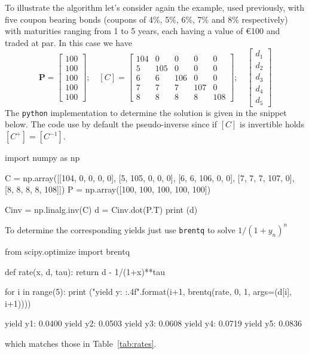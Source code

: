 To illustrate the algorithm let's consider again the example, used previously, with five coupon bearing bonds (coupons of 4\%, 5\%, 6\%, 7\% and 8\% respectively) with maturities ranging from 1 to 5 years, each having a value of \euro{100} and traded at par. In this case we have
\begin{equation*}
\boldsymbol{P} = 
\begin{bmatrix}
100 \\
100 \\
100 \\
100 \\
100 
\end{bmatrix}; \quad
[C] = 
\begin{bmatrix}
104 & 0 & 0 & 0 & 0 \\
5 & 105 & 0 & 0 & 0 \\
6 & 6 & 106 & 0 & 0 \\
7 & 7 & 7 & 107 & 0 \\
8 & 8 & 8 & 8 & 108
\end{bmatrix}; \quad
\begin{bmatrix}
d_1 \\
d_2 \\
d_3 \\
d_4 \\
d_5 
\end{bmatrix}
\end{equation*}
The \texttt{python} implementation to determine the solution is given in the snippet below. The code use by default the pseudo-inverse since if $[C]$ is invertible holds $[C^+] = [C^{-1}]$. 
\begin{ipython}
import numpy as np

C = np.array([[104, 0, 0, 0, 0],
              [5, 105, 0, 0, 0],
              [6, 6, 106, 0, 0],
              [7, 7, 7, 107, 0],
              [8, 8, 8, 8, 108]])
P = np.array([100, 100, 100, 100, 100])

Cinv = np.linalg.inv(C)
d = Cinv.dot(P.T)
print (d)
\end{ipython}
\begin{ioutput}
[0.96153846 0.90659341 0.83765291 0.75756548 0.66938146]	
\end{ioutput}
To determine the corresponding yields just use \texttt{brentq} to solve $1/(1+y_n)^{n}$
\begin{ipython}
from scipy.optimize import brentq

def rate(x, d, tau):
    return d - 1/(1+x)**tau

for i in range(5):
    print ("yield y{}: {:.4f}".format(i+1, brentq(rate, 0, 1, args=(d[i], i+1))))
\end{ipython}
\begin{ioutput}
yield y1: 0.0400
yield y2: 0.0503
yield y3: 0.0608
yield y4: 0.0719
yield y5: 0.0836
\end{ioutput}
which matches those in Table~\ref{tab:rates}.

